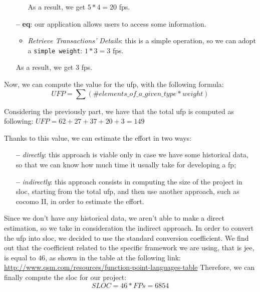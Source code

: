 \begin{itemize}
\begin{itemize}
As a result, we get $5 * 4 = 20$ \acs{fp}s.

\end{itemize}

\item[\textbf{--}] \textbf{\acl{eq}}: our application allows users to access some information. 

\begin{itemize}

	\item \textit{Retrieve Transactions' Details}: this is a simple operation, so we can adopt a \texttt{simple weight}: $1 * 3 = 3$ \acs{fp}s.
\end{itemize}

As a result, we get $3$ \acs{fp}s.

\end{itemize}

Now, we can compute the value for the \acl{ufp}, with the following formula:
\[ UFP = \sum (\#elements\_of\_a\_given\_type * weight)\]

Considering the previously part, we have that the total \acs{ufp} is computed as  following:
$UFP = 62 + 27 + 37 + 20 + 3 = 149$

Thanks to this value, we can estimate the effort in two ways:

\begin{itemize}

\item[\textbf{--}] \textit{directly}: this approach is viable only in case we have some historical data, so that we can know how much time it usually take for developing a \acs{fp};

\item[\textbf{--}] \textit{indirectly}: this approach consists in computing the size of the project in \acl{sloc}, starting from the total \acs{ufp}, and then use another approach, such as \acs{cocomo} II, in order to estimate the effort.

\end{itemize}

Since we don't have any historical data, we aren't able to make a direct estimation, so we take in consideration the indirect approach.
In order to convert the \acs{ufp} into \acs{sloc}, we decided to use the standard conversion coefficient. We find out that the coefficient related to the specific framework we are using, that is \acs{jee}, is equal to $46$, as shown in the table at the following link: \url{http://www.qsm.com/resources/function-point-languages-table}
Therefore, we can finally compute the \acs{sloc} for our project:
\[SLOC = 46 * FPs = 6854\]
